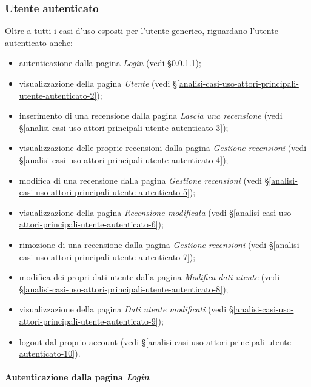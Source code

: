 \subsubsection{Utente autenticato}
\label{analisi-casi-uso-attori-principali-utente-autenticato}
Oltre a tutti i casi d'uso esposti per l'utente generico, riguardano l'utente autenticato anche:
\begin{itemize}
	\item autenticazione dalla pagina \textit{Login} (vedi §\ref{analisi-casi-uso-attori-principali-utente-autenticato-1});
	\item visualizzazione della pagina \textit{Utente} (vedi §\ref{analisi-casi-uso-attori-principali-utente-autenticato-2});
	\item inserimento di una recensione dalla pagina \textit{Lascia una recensione} (vedi §\ref{analisi-casi-uso-attori-principali-utente-autenticato-3});
	\item visualizzazione delle proprie recensioni dalla pagina \textit{Gestione recensioni} (vedi §\ref{analisi-casi-uso-attori-principali-utente-autenticato-4});
	\item modifica di una recensione dalla pagina \textit{Gestione recensioni} (vedi §\ref{analisi-casi-uso-attori-principali-utente-autenticato-5});
	\item visualizzazione della pagina \textit{Recensione modificata} (vedi §\ref{analisi-casi-uso-attori-principali-utente-autenticato-6});
	\item rimozione di una recensione dalla pagina \textit{Gestione recensioni} (vedi §\ref{analisi-casi-uso-attori-principali-utente-autenticato-7});
	\item modifica dei propri dati utente dalla pagina \textit{Modifica dati utente} (vedi §\ref{analisi-casi-uso-attori-principali-utente-autenticato-8});
	\item visualizzazione della pagina \textit{Dati utente modificati} (vedi §\ref{analisi-casi-uso-attori-principali-utente-autenticato-9});
	\item logout dal proprio account (vedi §\ref{analisi-casi-uso-attori-principali-utente-autenticato-10}).
\end{itemize}

\paragraph{Autenticazione dalla pagina \textit{Login}}
\label{analisi-casi-uso-attori-principali-utente-autenticato-1}

